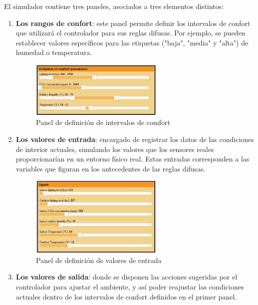 El simulador contiene tres paneles, asociados a tres elementos distintos:
\begin{enumerate}
	\item \textbf{Los rangos de confort}: este panel permite definir los intervalos de confort que utilizará el controlador para sus reglas difusas. Por ejemplo, se pueden establecer valores específicos para las etiquetas ("baja", "media" y "alta") de humedad o temperatura.
	
	\begin{figure}[H]
		\centering
		\includegraphics[width=0.6\textwidth]{imgs/simulator-comfort-params.JPG}
		\caption{Panel de definición de intervalos de comfort}
		\label{fig:simulator-comfort-params}
	\end{figure}
	
	\item \textbf{Los valores de entrada}: encargado de registrar los datos de las condiciones de interior actuales, simulando los valores que los sensores reales proporcionarían en un entorno físico real. Estas entradas corresponden a las variables que figuran en los antecedentes de las reglas difusas.
	
	\begin{figure}[H]
		\centering
		\includegraphics[width=0.6\textwidth]{imgs/simulator-panel-inputs.JPG}
		\caption{Panel de definición de valores de entrada}
		\label{fig:simulator-panel-inputs}
	\end{figure}
	
	\item \textbf{Los valores de salida}: donde se disponen las acciones sugeridas por el controlador para ajustar el ambiente, y así poder reajustar las condiciones actuales dentro de los intervalos de confort definidos en el primer panel.
	

\end{enumerate}
